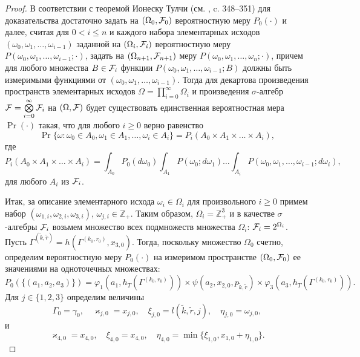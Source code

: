 \documentclass[a4paper,12pt,russian]{extarticle}
\begin{document}
\begin{proof}
В соответствии с теоремой Ионеску Тулчи (см. \cite{Shiryaev}, c. 348--351) для доказательства достаточно задать на $(\Omega_0, {\cal F}_0)$ вероятностную меру $P_0(\cdot)$ и далее, считая для $0 < i \leqslant n$ и каждого набора элементарных исходов $(\omega_0, \omega_1, \ldots, \omega_{i-1})$ заданной на $(\Omega_i, {\cal F}_i)$ вероятностную меру $P(\omega_0,\omega_1,\ldots, \omega_{i-1};\cdot)$, задать на $(\Omega_{n+1}, {\cal F}_{n+1})$ меру $P(\omega_0,\omega_1,\ldots, \omega_{n};\cdot)$, причем для любого множества $B\in {\cal F}_i$ функции $P(\omega_0,\omega_1,\ldots, \omega_{i-1};B)$
должны быть измеримыми функциями от $(\omega_0, \omega_1, \ldots, \omega_{i-1})$. Тогда для декартова произведения пространств элементарных исходов $\Omega=\prod\limits_{i=0}^{\infty}\Omega_i$ и произведения $\sigma$-алгебр ${\cal F}=\bigotimes\limits_{i=0}^{\infty} {\cal F}_i$ на $(\Omega,{\cal F})$ будет существовать единственная вероятностная мера $\Pr(\cdot)$ такая, что для любого $i \geqslant 0$ верно равенство
\begin{equation}
\Pr\{\omega \colon \omega_0 \in A_0, \omega_1 \in A_1, \ldots, \omega_i\in A_i\} = P_i(A_0 \times A_1 \times \ldots \times A_i),
\label{ProbabilitiesGeneral}
\end{equation}
где 
\begin{equation}
 P_i(A_0 \times A_1 \times \ldots \times A_i) = \int_{A_0} P_0(d \omega_0) \int_{A_1} P(\omega_0;d \omega_1) \ldots \int_{A_i} P(\omega_0, \omega_1, \ldots, \omega_{i-1}; d \omega_i),
\label{ProbabilitiesGeneralOne}
\end{equation}
для любого $A_i$ из ${\cal F}_i$. 

Итак, за описание элементарного исхода $\omega_i \in \Omega_i$ для произвольного $i \geqslant 0$ примем набор $(\omega_{1,i},\omega_{2,i},\omega_{3,i})$, $\omega_{j,i}\in \mathbb{Z}_+$. Таким образом, $\Omega_i=\mathbb{Z}_+^3$ и в качестве $\sigma$-алгебры ${\cal F}_i$ возьмем множество всех подмножеств множества $\Omega_i$: ${\cal F}_i=2^{\Omega_i}$. Пусть $\Gamma^{(\tilde{k},\tilde{r})}=h(\Gamma^{(k_0,r_0)},x_{3,0})$. Тогда,  поскольку множество $\Omega_0$ счетно, определим вероятностную меру $P_0(\cdot)$ на измеримом пространстве $(\Omega_0,{\cal F}_0)$ ее значениями на одноточечных множествах:
\begin{equation}
P_0(\{(a_1,a_2,a_3)\})=\varphi_1(a_1,h_T(\Gamma^{(k_0,r_0)})) \times \psi(a_2,x_{2,0}, p_{\tilde{k},\tilde{r}}) \times \varphi_3(a_3,h_T(\Gamma^{(k_0,r_0)})).
\label{probabilitiesOne}
\end{equation}
Для $j\in \{1,2,3\}$ определим величины
\begin{equation}
\Gamma_0=\gamma_0, \quad \varkappa_{j,0}=x_{j,0}, \quad \xi_{j,0}=l(\tilde{k},\tilde{r},j), \quad \eta_{j,0}=\omega_{j,0},
\label{startRekOne}
\end{equation}
и
\begin{equation}
 \varkappa_{4,0}=x_{4,0}, \quad \xi_{4,0}=x_{4,0}, \quad \eta_{4,0}=\min\{\xi_{1,0}, x_{1,0}+\eta_{1,0}\}.
\label{startRekTwo}
\end{equation}


\end{proof}
\end{document}
